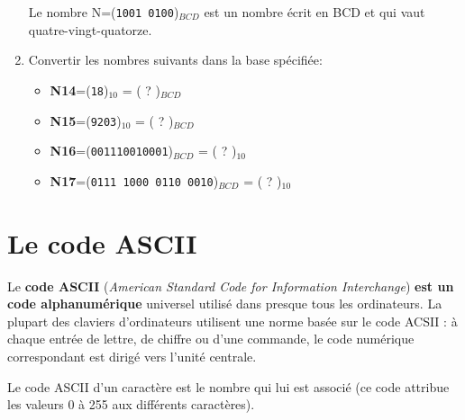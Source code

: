 \documentclass{article}
\begin{document}
\begin{enumerate}
\begin{minipage}[b]{.85\linewidth}
	Le nombre N=(\texttt{1001 0100})$_{BCD}$ est un nombre écrit en BCD et qui vaut quatre-vingt-quatorze.
\end{minipage}
	\item Convertir les nombres suivants dans la base spécifiée:
		\begin{itemize}
			\item \textbf{N14}=(\texttt{18})$_{10}$ = ( ? )$_{BCD}$\\
\vspace{1em}
\begin{Form}
	\TextField[name=r1714,width=\linewidth,height=2.5em,multiline=true,default=N14=]{}
\end{Form}
			\item \textbf{N15}=(\texttt{9203})$_{10}$ = ( ? )$_{BCD}$\\
\vspace{1em}
\begin{Form}
	\TextField[name=r1715,width=\linewidth,height=2.5em,multiline=true,default=N15=]{}
\end{Form}
			\item \textbf{N16}=(\texttt{001110010001})$_{BCD}$ = ( ? )$_{10}$\\
\vspace{1em}
\begin{Form}
	\TextField[name=r1716,width=\linewidth,height=2.5em,multiline=true,default=N16=]{}
\end{Form}
			\item \textbf{N17}=(\texttt{0111 1000 0110 0010})$_{BCD}$ = ( ? )$_{10}$\\
\vspace{1em}
\begin{Form}
	\TextField[name=r1717,width=\linewidth,height=2.5em,multiline=true,default=N17=]{}
\end{Form}
		\end{itemize}
\end{enumerate}
\section{Le code ASCII}
Le \textbf{code ASCII} (\emph{American Standard Code for Information Interchange}) \textbf{est un code alphanumérique} universel utilisé dans
presque tous les ordinateurs. La plupart des claviers d'ordinateurs utilisent une norme basée sur le code ACSII : à
chaque entrée de lettre, de chiffre ou d'une commande, le code numérique correspondant est dirigé vers l'unité centrale.

Le code ASCII d'un caractère est le nombre qui lui est associé (ce code attribue les valeurs 0 à 255 aux différents caractères).
\end{document}
